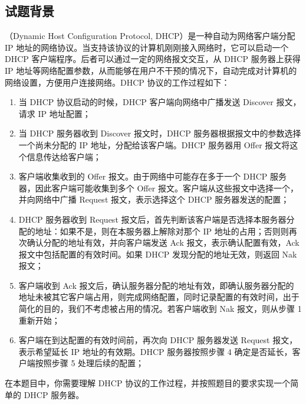 \subsection*{试题背景}

{}（Dynamic Host Configuration Protocol, DHCP）是一种自动为网络客户端分配 IP 地址的网络协议。当支持该协议的计算机刚刚接入网络时，它可以启动一个 DHCP 客户端程序。后者可以通过一定的网络报文交互，从 DHCP 服务器上获得 IP 地址等网络配置参数，从而能够在用户不干预的情况下，自动完成对计算机的网络设置，方便用户连接网络。DHCP 协议的工作过程如下：

\begin{enumerate}

    \item 当 DHCP 协议启动的时候，DHCP 客户端向网络中广播发送 Discover 报文，请求 IP 地址配置；

    \item 当 DHCP 服务器收到 Discover 报文时，DHCP 服务器根据报文中的参数选择一个尚未分配的 IP 地址，分配给该客户端。DHCP 服务器用 Offer 报文将这个信息传达给客户端；

    \item 客户端收集收到的 Offer 报文。由于网络中可能存在多于一个 DHCP 服务器，因此客户端可能收集到多个 Offer 报文。客户端从这些报文中选择一个，并向网络中广播 Request 报文，表示选择这个 DHCP 服务器发送的配置；

    \item DHCP 服务器收到 Request 报文后，首先判断该客户端是否选择本服务器分配的地址：如果不是，则在本服务器上解除对那个 IP 地址的占用；否则则再次确认分配的地址有效，并向客户端发送 Ack 报文，表示确认配置有效，Ack 报文中包括配置的有效时间。如果 DHCP 发现分配的地址无效，则返回 Nak 报文；

    \item 客户端收到 Ack 报文后，确认服务器分配的地址有效，即确认服务器分配的地址未被其它客户端占用，则完成网络配置，同时记录配置的有效时间，出于简化的目的，我们不考虑被占用的情况。若客户端收到 Nak 报文，则从步骤 1 重新开始；

    \item 客户端在到达配置的有效时间前，再次向 DHCP 服务器发送 Request 报文，表示希望延长 IP 地址的有效期。DHCP 服务器按照步骤 4 确定是否延长，客户端按照步骤 5 处理后续的配置；

\end{enumerate}

在本题目中，你需要理解 DHCP 协议的工作过程，并按照题目的要求实现一个简单的 DHCP 服务器。


